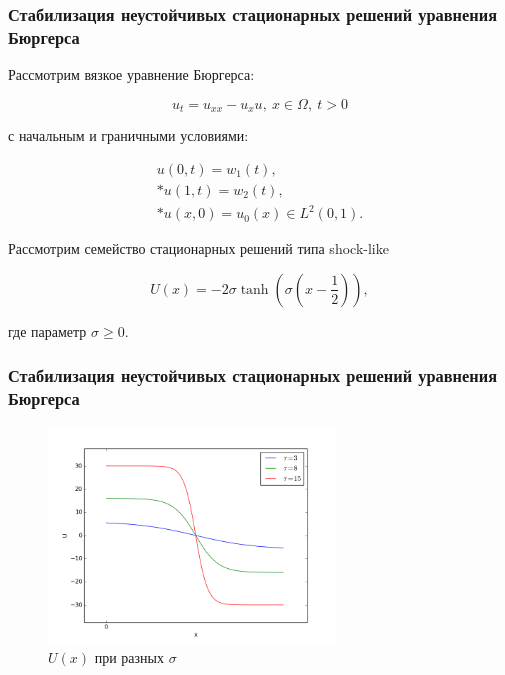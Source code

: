 \documentclass{beamer}
\begin{document}
\begin{frame}
\frametitle{Стабилизация неустойчивых стационарных решений уравнения Бюргерса}

Рассмотрим вязкое уравнение Бюргерса:
\begin{block}{}
\begin{equation}\label{burger}
  u_t = u_{xx} - u_x u, \ x \in \Omega, \ t > 0
\end{equation}
\end{block}
с начальным и граничными условиями:
\begin{block}{}
\begin{gather}\label{cond}
  u(0, t) = w_1(t), \\*
  u(1, t) = w_2(t), \\*
  u(x, 0) = u_{0}(x) \in L^2(0, 1). \nonumber
\end{gather}
\end{block}

Рассмотрим семейство стационарных решений типа shock-like

\begin{block}{}
\begin{equation}\label{shock_like}
  U(x) = -2\sigma\tanh{(\sigma(x - \frac{1}{2}))},
\end{equation}
\end{block}
где параметр $\sigma \ge 0$.

\end{frame}

\begin{frame}
\frametitle{Стабилизация неустойчивых стационарных решений уравнения Бюргерса}
\begin{figure}[H]
  \centering
  \includegraphics[width=3in]{fig1}
  \caption{$U(x)$ при разных $\sigma$}
\end{figure}
\end{frame}
\end{document}
